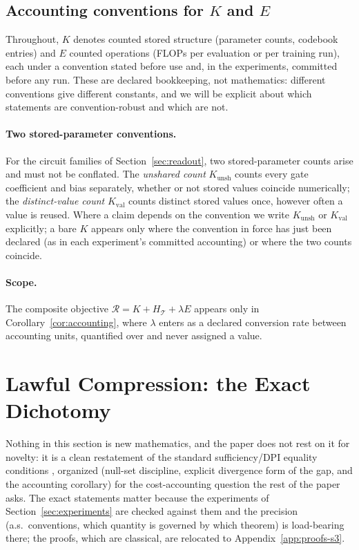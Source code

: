 \documentclass[twocolumn,10pt]{article}
\theoremstyle{definition}
\theoremstyle{remark}
\newcommand{\cT}{\mathcal{T}}
\newcommand{\cR}{\mathcal{R}}
\newcommand{\Kunsh}{K_{\mathrm{unsh}}}
\newcommand{\Kval}{K_{\mathrm{val}}}
\begin{document}
\subsection{Accounting conventions for \texorpdfstring{$K$}{K} and \texorpdfstring{$E$}{E}}
\label{sec:ke-conventions}

Throughout, $K$ denotes counted stored structure (parameter counts,
codebook entries) and $E$ counted operations (FLOPs per evaluation or per
training run), each under a convention stated before use and, in the
experiments, committed before any run. These are declared bookkeeping, not
mathematics: different conventions give different constants, and we will be
explicit about which statements are convention-robust and which are not.

\paragraph{Two stored-parameter conventions.} For the circuit families
of Section~\ref{sec:readout}, two stored-parameter counts arise and
must not be conflated. The \emph{unshared count} $\Kunsh$ counts every
gate coefficient and bias separately, whether or not stored values
coincide numerically; the \emph{distinct-value count} $\Kval$ counts
distinct stored values once, however often a value is reused. Where a
claim depends on the convention we write $\Kunsh$ or $\Kval$
explicitly; a bare $K$ appears only where the convention in force has
just been declared (as in each experiment's committed accounting) or
where the two counts coincide.

\paragraph{Scope.} The composite objective $\cR = K + H_\cT + \lambda E$
appears only in Corollary~\ref{cor:accounting}, where $\lambda$ enters as a
declared conversion rate between accounting units, quantified over and never
assigned a value.

\section{Lawful Compression: the Exact Dichotomy}
\label{sec:lawful}

Nothing in this section is new mathematics, and the paper does not
rest on it for novelty: it is a clean restatement of the standard
sufficiency/DPI equality conditions
\cite{coverthomas,kullback,polyanskiywu}, organized (null-set
discipline, explicit divergence form of the gap, and the accounting
corollary) for the cost-accounting question the rest of the paper
asks. The exact statements matter because the experiments of
Section~\ref{sec:experiments} are checked against them and the
precision (a.s.\ conventions, which quantity is governed by which
theorem) is load-bearing there; the proofs, which are classical, are
relocated to Appendix~\ref{app:proofs-s3}.
\end{document}

